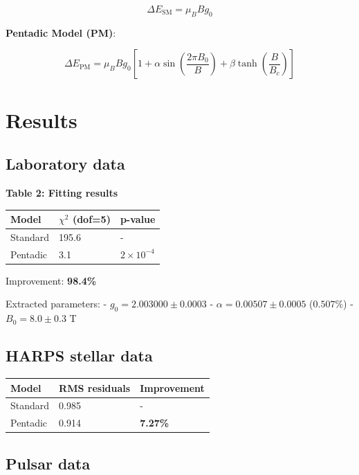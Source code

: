 \documentclass[11pt]{article}
\begin{document}
\[\Delta E_{\text{SM}} = \mu_B B g_0\]

\textbf{Pentadic Model (PM)}:

\[\Delta E_{\text{PM}} = \mu_B B g_0 \left[1 + \alpha \sin\left(\frac{2\pi B_0}{B}\right) + \beta \tanh\left(\frac{B}{B_c}\right)\right]\]

\hypertarget{results}{%
\section{Results}\label{results}}

\hypertarget{laboratory-data}{%
\subsection{Laboratory data}\label{laboratory-data}}

\textbf{Table 2: Fitting results}

\begin{longtable}[]{@{}lll@{}}
\toprule
Model & \(\chi^2\) (dof=5) & p-value \\
\midrule
\endhead
Standard & 195.6 & - \\
Pentadic & 3.1 & \(2\times10^{-4}\) \\
\bottomrule
\end{longtable}

Improvement: \textbf{98.4\%}

Extracted parameters: - \(g_0 = 2.003000 \pm 0.0003\) -
\(\alpha = 0.00507 \pm 0.0005\) (\(0.507\%\)) - \(B_0 = 8.0 \pm 0.3\) T

\hypertarget{harps-stellar-data}{%
\subsection{HARPS stellar data}\label{harps-stellar-data}}

\begin{longtable}[]{@{}lll@{}}
\toprule
Model & RMS residuals & Improvement \\
\midrule
\endhead
Standard & 0.985 & - \\
Pentadic & 0.914 & \textbf{7.27\%} \\
\bottomrule
\end{longtable}

\hypertarget{pulsar-data}{%
\subsection{Pulsar data}\label{pulsar-data}}
\end{document}
